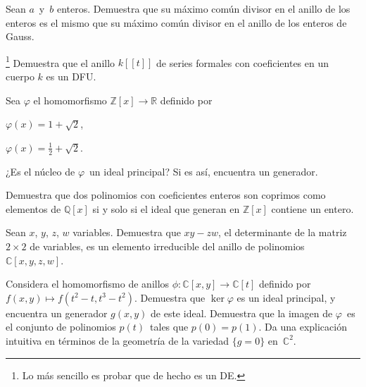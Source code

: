 \documentclass[12pt]{article}
\begin{document}
    \begin{exercise}[12.2.7]
        Sean $a$~y~$b$ enteros. Demuestra que su máximo común divisor en el anillo de los enteros es el mismo que su máximo común divisor en el anillo de los enteros de Gauss.
    \end{exercise}
    
    
    \begin{exercise}[12.2.10]\hspace{-4mm}\footnote{Lo más sencillo es probar que de hecho es un DE.}
        Demuestra que el anillo $k[\![t]\!]$ de series formales con coeficientes en un cuerpo $k$ es un DFU.
    \end{exercise}
    
    
    \begin{exercise}[12.3.1]
        Sea $\varphi$ el homomorfismo $\mathbb{Z}[x]\to \mathbb{R}$ definido por 
        
        
        \noindent
        \begin{inparaenum}[\bfseries(a)]
            \item $\varphi(x)=1+\sqrt{2}$,
            \item $\varphi(x)=\frac{1}{2}+\sqrt{2}$.
        \end{inparaenum}
        
        \noindent
        ¿Es el núcleo de $\varphi$~un ideal principal? Si es así, encuentra un generador.
    \end{exercise}
    
    \begin{exercise}[12.3.2]
        Demuestra que dos polinomios con coeficientes enteros son coprimos como elementos de $\mathbb{Q}[x]$ si y solo si el ideal que generan en $\mathbb{Z}[x]$ contiene un entero.
    \end{exercise}
    
    
    \begin{exercise}[12.3.4]
        Sean $x$, $y$, $z$, $w$ variables. Demuestra que $xy-zw$, el determinante de la matriz $2\times2$ de variables, es  un elemento irreducible del anillo de polinomios $\mathbb{C}[x,y,z,w]$.
    \end{exercise}
    
    
    \begin{exercise}[12.3.5.b]
        Considera el homomorfismo de anillos $\phi\colon \mathbb{C}[x,y]\to \mathbb{C}[t]$ definido por $f(x,y)\mapsto f(t^{2}-t,t^{3}-t^{2})$. Demuestra que $\ker \varphi$ es un ideal principal, y encuentra un generador $g(x,y)$ de este ideal. Demuestra que la imagen de $\varphi$~es el conjunto de polinomios $p(t)$~tales que $p(0)=p(1)$. Da una explicación intuitiva en términos de la geometría de la variedad $\{g=0\}$ en~$\mathbb{C}^{2}$.
    \end{exercise}
  
\end{document}
